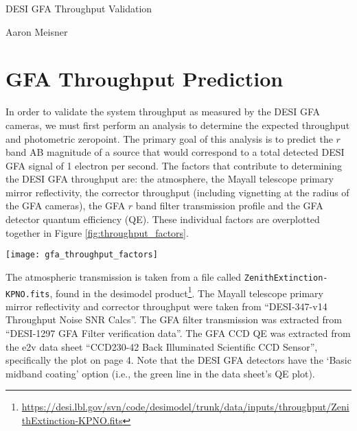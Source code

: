 \documentclass{article}
\begin{document}
\begin{center}
\Large
DESI GFA Throughput Validation
\end{center}

\normalsize

\begin{center}
Aaron Meisner
\end{center}

\section{GFA Throughput Prediction}


In order to validate the system throughput as measured by the DESI GFA cameras, we must first perform an analysis to determine the expected throughput and photometric zeropoint. The primary goal of this analysis is to predict the $r$ band AB magnitude of a source that would correspond to a total detected DESI GFA signal of 1 electron per second. The factors that contribute to determining the DESI GFA throughput are: the atmosphere, the Mayall telescope primary mirror reflectivity, the corrector throughput (including vignetting at the radius of the GFA cameras), the GFA $r$ band filter transmission profile and the GFA detector quantum efficiency (QE). These individual factors are overplotted together in Figure \ref{fig:throughput_factors}.



\begin{figure*}[ht]
        \texttt{[image: gfa\_throughput\_factors]}
    \caption{Summary of the multiplicative factors that contribute to determining the total DESI GFA throughput as a function of wavelength.}
    \label{fig:throughput_factors}
\end{figure*}

The atmospheric transmission is taken from a file called \verb|ZenithExtinction-KPNO.fits|, found in the desimodel product\footnote{\url{https://desi.lbl.gov/svn/code/desimodel/trunk/data/inputs/throughput/ZenithExtinction-KPNO.fits}}. The Mayall telescope primary mirror reflectivity and corrector throughput were taken from ``DESI-347-v14 Throughput Noise SNR Calcs''. The GFA filter transmission was extracted from ``DESI-1297 GFA Filter verification data''. The GFA CCD QE was extracted from the e2v data sheet ``CCD230-42 Back Illuminated Scientific CCD Sensor'', specifically the plot on page 4. Note that the DESI GFA detectors have the `Basic midband coating' option (i.e., the green line in the data sheet's QE plot).
\end{document}
